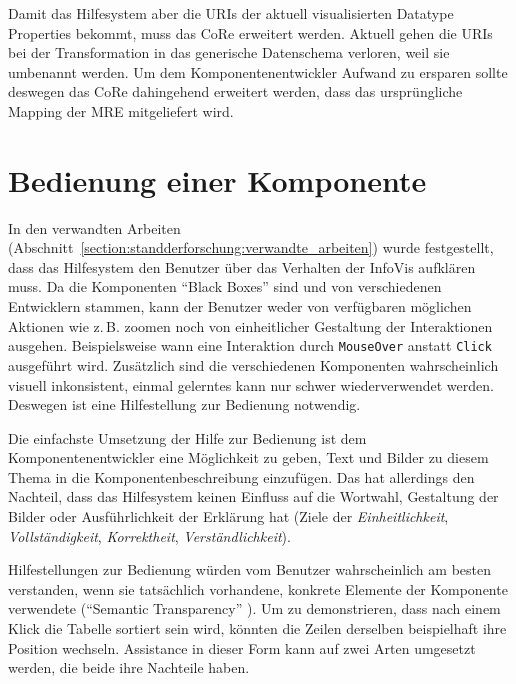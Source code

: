\documentclass[
	headsepline,
	footsepline,
	fontsize=12pt,
	bibliography=totoc
]{scrbook}
\begin{document}

Damit das Hilfesystem aber die URIs der aktuell visualisierten Datatype Properties bekommt, muss das CoRe erweitert werden. Aktuell gehen die URIs bei der Transformation in das generische Datenschema verloren, weil sie umbenannt werden. Um dem Komponentenentwickler Aufwand zu ersparen sollte deswegen das CoRe dahingehend erweitert werden, dass das ursprüngliche Mapping der MRE mitgeliefert wird.


\section{Bedienung einer Komponente}
\label{section:konzeption:bedienung}

In den verwandten Arbeiten (Abschnitt~\ref{section:standderforschung:verwandte_arbeiten}) wurde festgestellt, dass das Hilfesystem den Benutzer über das Verhalten der InfoVis aufklären muss. Da die Komponenten \enquote{Black Boxes} sind und von verschiedenen Entwicklern stammen, kann der Benutzer weder von verfügbaren möglichen Aktionen wie z.\,B. zoomen noch von einheitlicher Gestaltung der Interaktionen ausgehen. Beispielsweise wann eine Interaktion durch \texttt{MouseOver} anstatt \texttt{Click} ausgeführt wird. Zusätzlich sind die verschiedenen Komponenten wahrscheinlich visuell inkonsistent, einmal gelerntes kann nur schwer wiederverwendet werden. Deswegen ist eine Hilfestellung zur Bedienung notwendig.


Die einfachste Umsetzung der Hilfe zur Bedienung ist dem Komponentenentwickler eine Möglichkeit zu geben, Text und Bilder zu diesem Thema in die Komponentenbeschreibung einzufügen. Das hat allerdings den Nachteil, dass das Hilfesystem keinen Einfluss auf die Wortwahl, Gestaltung der Bilder oder Ausführlichkeit der Erklärung hat (Ziele der \emph{Einheitlichkeit}, \emph{Vollständigkeit}, \emph{Korrektheit}, \emph{Verständlichkeit}).

Hilfestellungen zur Bedienung würden vom Benutzer wahrscheinlich am besten verstanden, wenn sie tatsächlich vorhandene, konkrete Elemente der Komponente verwendete (\enquote{Semantic Transparency} \cite{Kohlhase2009}). Um zu demonstrieren, dass nach einem Klick die Tabelle sortiert sein wird, könnten die Zeilen derselben beispielhaft ihre Position wechseln. Assistance in dieser Form kann auf zwei Arten umgesetzt werden, die beide ihre Nachteile haben.
\end{document}
